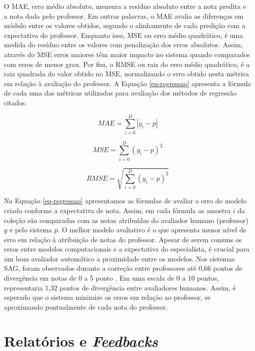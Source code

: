 O MAE, erro médio absoluto, mensura a resíduo absoluto entre a nota predita e a nota dada pelo professor. Em outras palavras, o MAE avalia as diferenças em módulo entre os valores obtidos, segundo o alinhamento de cada predição com a expectativa do professor. Enquanto isso, MSE ou erro médio quadrático, é uma medida do resíduo entre os valores com penalização dos erros absolutos. Assim, através do MSE erros maiores têm maior impacto no sistema quando comparados com erros de menor grau. Por fim, o RMSE ou raiz do erro médio quadrático, é a raiz quadrada do valor obtido no MSE, normalizando o erro obtido nesta métrica em relação à avaliação do professor. A Equação \ref{eq-regressao} apresenta a fórmula de cada uma das métricas utilizadas para avaliação dos métodos de regressão citados.

\begin{equation}
MAE = \sum_{i=0}^{D}|y_i-p|
\label{eq-regressao}
\end{equation}

\begin{equation*}
MSE = \sum_{i=0}^{D}(y_i-p)^2
\end{equation*}

\begin{equation*}
RMSE = \sqrt{\sum_{i=0}^{D}(y_i-p)^2}
\end{equation*}

Na Equação \ref{eq-regressao} apresentamos as fórmulas de avaliar o erro do modelo criado conforme a expectativa de nota. Assim, em cada fórmula as amostra $ i $ da coleção são comparadas com as notas atribuídas do avaliador humano (professor) $ y $ e pelo sistema $ p $. O melhor modelo avaliativo é o que apresenta menor nível de erro em relação à atribuição de notas do professor. Apesar de serem comuns os erros entre modelos computacionais e a expectativa do especialista, é crucial para um bom avaliador automático a proximidade entre os modelos. Nos sistemas SAG, foram observados durante a correção entre professores até 0,66 pontos de divergência em notas de 0 a 5 ponto \cite{mohler2011}. Em uma escala de 0 a 10 pontos, representaria 1,32 pontos de divergência entre avaliadores humanos. Assim, é esperado que o sistema minimize os erros em relação ao professor, se aproximando pontualmente de cada nota do professor.


\section{Relatórios e \textit{Feedbacks}}
\label{sec-relatorios}

